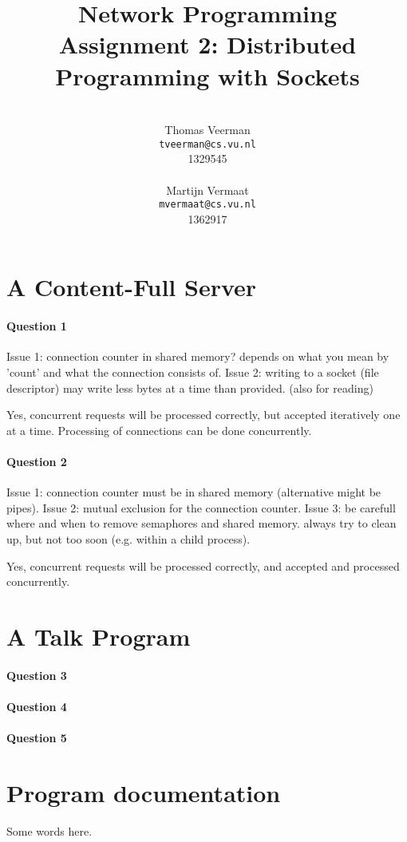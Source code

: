 \documentclass[a4paper,10pt]{article}
\title{Network Programming\\
\small{Assignment 2: Distributed Programming with Sockets}}
\author{%
        \mbox{}\\
        Thomas Veerman\\
        \texttt{tveerman@cs.vu.nl}\\
        1329545\\
        \mbox{}\\
        Martijn Vermaat\\
        \texttt{mvermaat@cs.vu.nl}\\
        1362917
}
\begin{document}
\maketitle


\section{A Content-Full Server}
\paragraph{Question 1}
Issue 1: connection counter in shared memory? depends on what you mean by 'count' and
what the connection consists of.
Issue 2: writing to a socket (file descriptor) may write less bytes at a time than
provided. (also for reading)

Yes, concurrent requests will be processed correctly, but accepted iteratively one at a
time. Processing of connections can be done concurrently.

\paragraph{Question 2}
Issue 1: connection counter must be in shared memory (alternative might be pipes).
Issue 2: mutual exclusion for the connection counter.
Issue 3: be carefull where and when to remove semaphores and shared memory. always try
to clean up, but not too soon (e.g. within a child process).

Yes, concurrent requests will be processed correctly, and accepted and processed
concurrently.

\section{A Talk Program}
\paragraph{Question 3}

\paragraph{Question 4}

\paragraph{Question 5}


\section{Program documentation}

Some words here.
\end{document}
